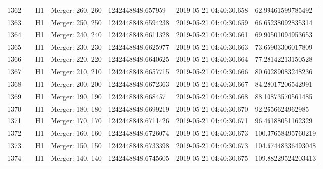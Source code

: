 \begin{longtable}{lllllll}
1362 &                                                    &       H1 &  Merger: 260, 260 &   1242448848.657959 &  2019-05-21 04:40:30.658 &   62.99461599785492 \\
1363 &                                                    &       H1 &  Merger: 250, 250 &  1242448848.6594238 &  2019-05-21 04:40:30.659 &   66.65238092835314 \\
1364 &                                                    &       H1 &  Merger: 240, 240 &  1242448848.6611328 &  2019-05-21 04:40:30.661 &   69.90501094953653 \\
1365 &                                                    &       H1 &  Merger: 230, 230 &  1242448848.6625977 &  2019-05-21 04:40:30.663 &   73.65903306017809 \\
1366 &                                                    &       H1 &  Merger: 220, 220 &  1242448848.6640625 &  2019-05-21 04:40:30.664 &   77.28142213150528 \\
1367 &                                                    &       H1 &  Merger: 210, 210 &  1242448848.6657715 &  2019-05-21 04:40:30.666 &   80.60289083248236 \\
1368 &                                                    &       H1 &  Merger: 200, 200 &  1242448848.6672363 &  2019-05-21 04:40:30.667 &   84.28017206542991 \\
1369 &                                                    &       H1 &  Merger: 190, 190 &   1242448848.668457 &  2019-05-21 04:40:30.668 &   88.10873570561485 \\
1370 &                                                    &       H1 &  Merger: 180, 180 &  1242448848.6699219 &  2019-05-21 04:40:30.670 &    92.2656624962985 \\
1371 &                                                    &       H1 &  Merger: 170, 170 &  1242448848.6711426 &  2019-05-21 04:40:30.671 &   96.46188051162329 \\
1372 &                                                    &       H1 &  Merger: 160, 160 &  1242448848.6726074 &  2019-05-21 04:40:30.673 &  100.37658495760219 \\
1373 &                                                    &       H1 &  Merger: 150, 150 &  1242448848.6733398 &  2019-05-21 04:40:30.673 &  104.67448336493048 \\
1374 &                                                    &       H1 &  Merger: 140, 140 &  1242448848.6745605 &  2019-05-21 04:40:30.675 &  109.88229524203413 \\

\end{longtable}
